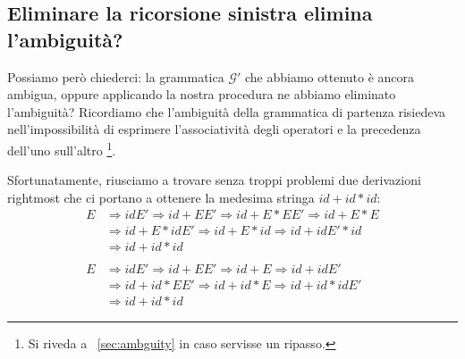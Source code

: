 \documentclass[class=book, crop=false, oneside, 12pt]{standalone}
\begin{document}
\subsection{Eliminare la ricorsione sinistra elimina l'ambiguità?}
Possiamo però chiederci: la grammatica \(\mathcal{G'}\) che abbiamo ottenuto è ancora ambigua, oppure applicando la nostra procedura ne abbiamo eliminato l'ambiguità? Ricordiamo che l'ambiguità della grammatica di partenza risiedeva nell'impossibilità di esprimere l'associatività degli operatori e la precedenza dell'uno sull'altro \footnote{Si riveda a ~\ref{sec:ambguity} in caso servisse un ripasso.}. 

Sfortunatamente, riusciamo a trovare senza troppi problemi due derivazioni rightmost che ci portano a ottenere la medesima stringa \(id + id * id\):
\begin{align*}
    E &\Rightarrow idE' \Rightarrow id + EE' \Rightarrow id + E * EE' \Rightarrow id + E * E \\
        &\Rightarrow id + E * idE' \Rightarrow id + E * id \Rightarrow id + idE' * id \\
        &\Rightarrow id + id * id 
    \\ \\
    E &\Rightarrow idE' \Rightarrow id + EE' \Rightarrow id + E \Rightarrow id + idE' \\
        &\Rightarrow id + id * EE' \Rightarrow id + id * E \Rightarrow id + id * idE' \\
        &\Rightarrow id + id * id  
\end{align*}
\end{document}
